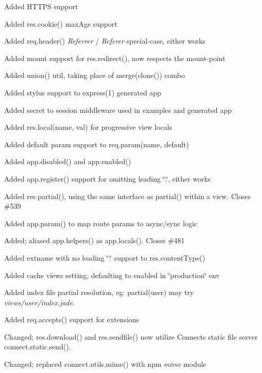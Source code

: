 \begin{DoxyItemize}
\item Added H\+T\+T\+P\+S support
\item Added {\ttfamily res.\+cookie()} max\+Age support
\item Added {\ttfamily req.\+header()} {\itshape Referrer} / {\itshape Referer} special-\/case, either works
\item Added mount support for {\ttfamily res.\+redirect()}, now respects the mount-\/point
\item Added {\ttfamily union()} util, taking place of {\ttfamily merge(clone())} combo
\item Added stylus support to express(1) generated app
\item Added secret to session middleware used in examples and generated app
\item Added {\ttfamily res.\+local(name, val)} for progressive view locals
\item Added default param support to {\ttfamily req.\+param(name, default)}
\item Added {\ttfamily app.\+disabled()} and {\ttfamily app.\+enabled()}
\item Added {\ttfamily app.\+register()} support for omitting leading \char`\"{}.\char`\"{}, either works
\item Added {\ttfamily res.\+partial()}, using the same interface as {\ttfamily partial()} within a view. Closes \#539
\item Added {\ttfamily app.\+param()} to map route params to async/sync logic
\item Added; aliased {\ttfamily app.\+helpers()} as {\ttfamily app.\+locals()}. Closes \#481
\item Added extname with no leading \char`\"{}.\char`\"{} support to {\ttfamily res.\+content\+Type()}
\item Added {\ttfamily cache views} setting, defaulting to enabled in \char`\"{}production\char`\"{} env
\item Added index file partial resolution, eg\+: partial(\textquotesingle{}user\textquotesingle{}) may try {\itshape views/user/index.\+jade}.
\item Added {\ttfamily req.\+accepts()} support for extensions
\item Changed; {\ttfamily res.\+download()} and {\ttfamily res.\+sendfile()} now utilize Connect\textquotesingle{}s static file server {\ttfamily connect.\+static.\+send()}.
\item Changed; replaced {\ttfamily connect.\+utils.\+mime()} with npm {\itshape mime} module

\end{DoxyItemize}
